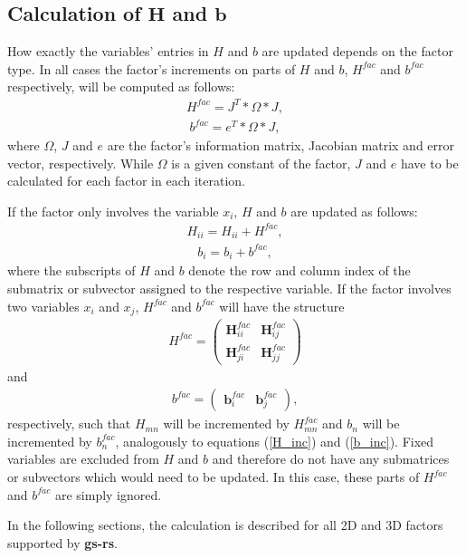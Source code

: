 \subsection{Calculation of $\boldsymbol{H}$ and $\boldsymbol{b}$}
How exactly the variables' entries in $H$ and $b$ are updated depends on the factor type. In all cases the factor's increments on parts of $H$ and $b$, $H^{fac}$ and $b^{fac}$ respectively, will be computed as follows:
\begin{align}
H^{fac} = J^T * \Omega * J,
\end{align}
\begin{align}
b^{fac} = e^T * \Omega * J,
\end{align}
where $\Omega$, $J$ and $e$ are the factor's information matrix, Jacobian matrix and error vector, respectively. While $\Omega$ is a given constant of the factor, $J$ and $e$ have to be calculated for each factor in each iteration.

If the factor only involves the variable $x_i$, $H$ and $b$ are updated as follows:
\begin{align}
\label{H_inc}
H_{ii} = H_{ii} + H^{fac},
\end{align}
\begin{align}
\label{b_inc}
b_i = b_i + b^{fac},
\end{align}
where the subscripts of $H$ and $b$ denote the row and column index of the submatrix or subvector assigned to the respective variable. If the factor involves two variables $x_i$ and $x_j$, $H^{fac}$ and $b^{fac}$ will have the structure
\begin{align}
H^{fac} =
\begin{pmatrix}
\boldsymbol{H}^{fac}_{ii} & \boldsymbol{H}^{fac}_{ij}\\
\boldsymbol{H}^{fac}_{ji} & \boldsymbol{H}^{fac}_{jj}
\end{pmatrix}
\end{align}
and
\begin{align}
b^{fac} =
\begin{pmatrix}
\boldsymbol{b}^{fac}_{i} & \boldsymbol{b}^{fac}_{j}
\end{pmatrix},
\end{align}
respectively, such that $H_{mn}$ will be incremented by $H^{fac}_{mn}$ and $b_n$ will be incremented by $b^{fac}_n$, analogously to equations (\ref{H_inc}) and (\ref{b_inc}). Fixed variables are excluded from $H$ and $b$ and therefore do not have any submatrices or subvectors which would need to be updated. In this case, these parts of $H^{fac}$ and $b^{fac}$ are simply ignored.

In the following sections, the calculation is described for all 2D and 3D factors supported by \textbf{gs-rs}.